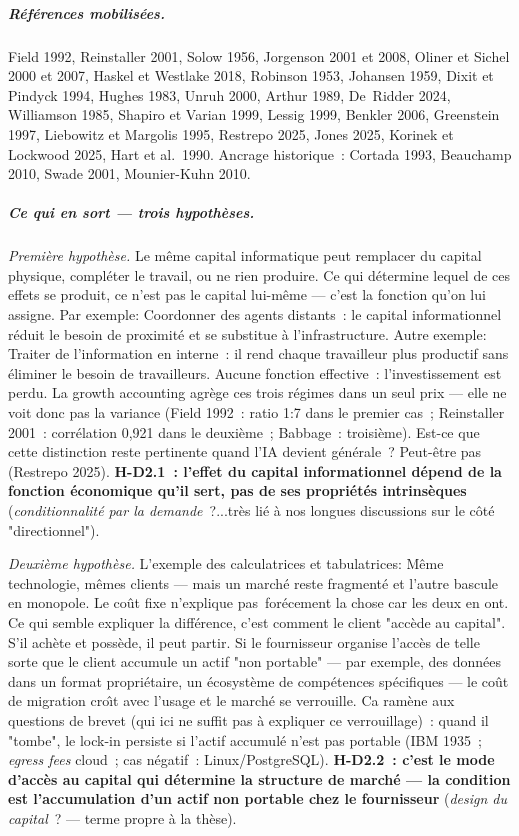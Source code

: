 \subparagraph{Références mobilisées.}
Field 1992, Reinstaller 2001, Solow 1956, Jorgenson 2001 et 2008, Oliner et Sichel 2000 et 2007, Haskel et Westlake 2018, Robinson 1953, Johansen 1959, Dixit et Pindyck 1994, Hughes 1983, Unruh 2000, Arthur 1989, De~Ridder 2024, Williamson 1985, Shapiro et Varian 1999, Lessig 1999, Benkler 2006, Greenstein 1997, Liebowitz et Margolis 1995, Restrepo 2025, Jones 2025, Korinek et Lockwood 2025, Hart et al.\ 1990. Ancrage historique~: Cortada 1993, Beauchamp 2010, Swade 2001, Mounier-Kuhn 2010.

\subparagraph{Ce qui en sort --- trois hypoth\`eses.}

\emph{Premi\`ere hypoth\`ese.} Le m\^eme capital informatique peut remplacer du capital physique, compl\'eter le travail, ou ne rien produire. Ce qui d\'etermine lequel de ces effets se produit, ce n'est pas le capital lui-m\^eme --- c'est la fonction qu'on lui assigne. Par exemple: Coordonner des agents distants~: le capital informationnel r\'eduit le besoin de proximit\'e et se substitue \`a l'infrastructure. Autre exemple: Traiter de l'information en interne~: il rend chaque travailleur plus productif sans \'eliminer le besoin de travailleurs. Aucune fonction effective~: l'investissement est perdu. La growth accounting agr\`ege ces trois r\'egimes dans un seul prix --- elle ne voit donc pas la variance (Field 1992~: ratio 1:7 dans le premier cas~; Reinstaller 2001~: corr\'elation 0,921 dans le deuxi\`eme~; Babbage~: troisi\`eme). Est-ce que cette distinction reste pertinente quand l'IA devient g\'en\'erale~? Peut-\^etre pas (Restrepo 2025). \textbf{H-D2.1~: l'effet du capital informationnel d\'epend de la fonction \'economique qu'il sert, pas de ses propri\'et\'es intrins\`eques} (\emph{conditionnalit\'e par la demande}~?...très lié à nos longues discussions sur le côté "directionnel").

\emph{Deuxi\`eme hypoth\`ese.} L'exemple des calculatrices et tabulatrices: M\^eme technologie, m\^emes clients --- mais un march\'e reste fragment\'e et l'autre bascule en monopole. Le co\^ut fixe n'explique pas~forécement la chose car les deux en ont. Ce qui semble expliquer la diff\'erence, c'est comment le client "acc\`ede au capital". S'il ach\`ete et poss\`ede, il peut partir. Si le fournisseur organise l'acc\`es de telle sorte que le client accumule un actif "non portable" --- par exemple, des donn\'ees dans un format propri\'etaire, un \'ecosyst\`eme de comp\'etences sp\'ecifiques --- le co\^ut de migration cro\^{\i}t avec l'usage et le march\'e se verrouille. Ca ramène aux questions de brevet (qui ici ne suffit pas \`a expliquer ce verrouillage)~: quand il "tombe", le lock-in persiste si l'actif accumul\'e n'est pas portable (IBM 1935~; \emph{egress fees} cloud~; cas n\'egatif~: Linux/PostgreSQL). \textbf{H-D2.2~: c'est le mode d'acc\`es au capital qui d\'etermine la structure de march\'e --- la condition est l'accumulation d'un actif non portable chez le fournisseur} (\emph{design du capital}~? --- terme propre \`a la th\`ese).

